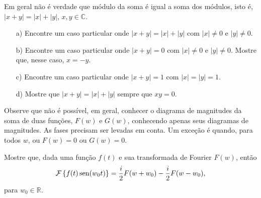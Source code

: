 \begin{Exercise} Em geral não é verdade que módulo da soma é igual a soma dos módulos, isto é, $|x+y|=|x|+|y|$, $x,y\in\mathbb{C}$.
\begin{itemize}
\item[a)] Encontre um caso particular onde $|x+y|=|x|+|y|$ com $|x|\neq 0$ e $|y|\neq 0$.
\item[b)] Encontre um caso particular onde $|x+y|=0$ com $|x|\neq 0$ e $|y|\neq 0$. Mostre que, nesse caso, $x=-y$.
\item[c)] Encontre um caso particular onde $|x+y|=1$ com $|x|=|y|=1$.
\item[d)] Mostre que $|x+y|=|x|+|y|$ sempre que $xy=0$.
\end{itemize}
Observe que não é possível, em geral, conhecer o diagrama de magnitudes da soma de duas funções, $F(w)$ e $G(w)$, conhecendo apenas seus diagramas de magnitudes. As fases precisam ser levadas em conta. Um exceção é quando, para todos $w$, ou $F(w)=0$ ou $G(w)=0$.
\end{Exercise}
\begin{Exercise}{\label{ex_mod_sin}}Mostre que, dada uma função $f(t)$ e sua transformada de Fourier $F(w)$, então
$$
\mathcal{F}\left\{f(t)\operatorname{sen}(w_0t) \right\}=\frac{i}{2}F(w+w_0)-\frac{i}{2 }F(w-w_0),
$$
para $w_0\in\mathbb{R}$.

\end{Exercise}

